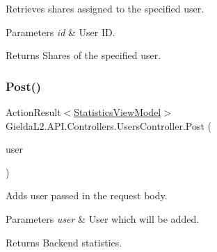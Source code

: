 Retrieves shares assigned to the specified user. 


\begin{DoxyParams}{Parameters}
{\em id} & User ID.\\
\hline
\end{DoxyParams}
\begin{DoxyReturn}{Returns}
Shares of the specified user.
\end{DoxyReturn}
\mbox{\label{class_gielda_l2_1_1_a_p_i_1_1_controllers_1_1_users_controller_a75e8fafc661b2159421b40427f627a92}} 
\subsubsection{\texorpdfstring{Post()}{Post()}}
{\footnotesize\ttfamily Action\+Result$<$\mbox{\hyperlink{class_gielda_l2_1_1_a_p_i_1_1_view_models_1_1_view_1_1_statistics_view_model}{Statistics\+View\+Model}}$>$ Gielda\+L2.\+A\+P\+I.\+Controllers.\+Users\+Controller.\+Post (\begin{DoxyParamCaption}\item[{\mbox{[}\+From\+Body\mbox{]} \mbox{\hyperlink{class_gielda_l2_1_1_a_p_i_1_1_view_models_1_1_edit_1_1_edit_user_view_model}{Edit\+User\+View\+Model}}}]{user }\end{DoxyParamCaption})}



Adds user passed in the request body. 


\begin{DoxyParams}{Parameters}
{\em user} & User which will be added.\\
\hline
\end{DoxyParams}
\begin{DoxyReturn}{Returns}
Backend statistics.
\end{DoxyReturn}
\mbox{\label{class_gielda_l2_1_1_a_p_i_1_1_controllers_1_1_users_controller_abe00d21f9abb32cb07ada5815bec4e0a}} 
